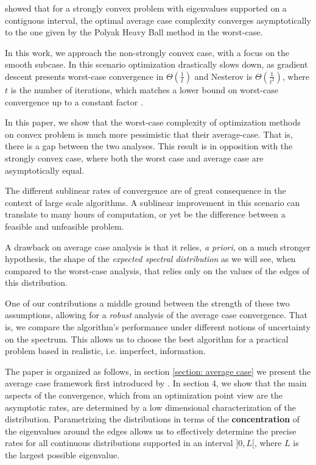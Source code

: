\documentclass{article}
\begin{document}
\cite{scieur2020universal} showed that for a strongly convex problem with eigenvalues supported on a contiguous interval, the optimal average case complexity converges asymptotically to the one given by the Polyak Heavy Ball method in the worst-case.  

In this work, we approach the non-strongly convex case, with a focus on the smooth subcase. In this scenario optimization drastically slows down, as gradient descent presents worst-case convergence in $\Theta(\frac{1}{t})$ and Nesterov is $\Theta(\frac{1}{t^2})$, where $t$ is the number of iterations, which matches a lower bound on worst-case convergence up to a constant factor \citep{nesterov2003introductory}. 


In this paper, we show that the worst-case complexity of optimization methods on convex problem is much more pessimistic that their average-case. That is, there is a gap between the two analyses. This result is in opposition with the strongly convex case, where both the worst case and average case are asymptotically equal.

The different sublinear rates of convergence are of great consequence in the context of large scale algorithms. A sublinear improvement in this scenario can translate to many hours of computation, or yet be the difference between a feasible and unfeasible problem.


A drawback on average case analysis is that it relies, \textit{a priori}, on a much stronger hypothesis, the shape of the \textit{expected spectral distribution} as we will see, when compared to the worst-case analysis, that relies only on the values of the edges of this distribution. 

One of our contributions a middle ground between the strength of these two assumptions, allowing for a \emph{robust} analysis of the average case convergence. That is, we compare the algorithm's performance under different notions of uncertainty on the spectrum. This allows us  to choose the best algorithm for a practical problem based in realistic, i.e. imperfect, information.

The paper is organized as follows, in section \ref{section: average case} we present the average case framework first introduced by \cite{pedregosa2020acceleration}. In section 4, we  show that the main aspects of the convergence, which from an optimization point view are the asymptotic rates, are determined by a low dimensional characterization of the distribution. Parametrizing the distributions in terms of the \textbf{concentration} of the eigenvalues around the edges allows us to effectively determine the precise rates for all continuous distributions supported in an interval $]0,L[$, where $L$ is the largest possible eigenvalue. 
\end{document}
